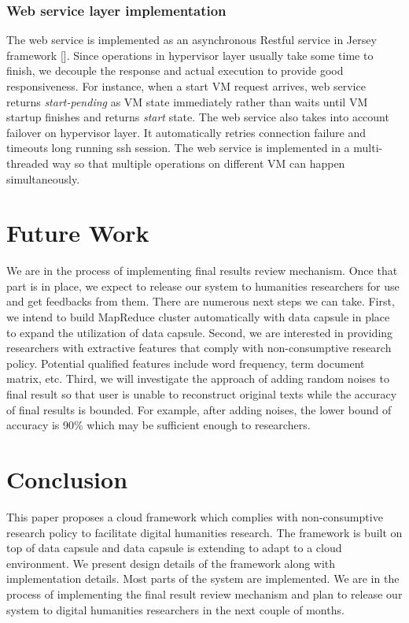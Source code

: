 \documentclass{acm_proc_article-sp}
\begin{document}
\subsubsection{Web service layer implementation}
The web service is implemented as an asynchronous Restful service in Jersey framework []. Since operations in hypervisor layer usually take some time to finish, we decouple the response and actual execution to provide good responsiveness. For instance, when a start VM request arrives, web service returns \emph{start-pending} as VM state immediately rather than waits until VM startup finishes and returns \emph{start} state. The web service also takes into account failover on hypervisor layer. It automatically retries connection failure and timeouts long running ssh session. The web service is implemented in a multi-threaded way so that multiple operations on different VM can happen simultaneously.


\section{Future Work} \label{title:future}
We are in the process of implementing final results review mechanism. Once that part is in place, we expect to release our system to humanities researchers for use and get feedbacks from them. There are numerous next steps we can take. First, we intend to build MapReduce cluster automatically with data capsule in place to expand the utilization of data capsule. Second, we are interested in providing researchers with extractive features that comply with non-consumptive research policy. Potential qualified features include word frequency, term document matrix, etc. Third, we will investigate the approach of adding random noises to final result so that user is unable to reconstruct original texts while the accuracy of final results is bounded. For example, after adding noises, the lower bound of accuracy is 90\% which may be sufficient enough to researchers.

\section{Conclusion} \label{title:conclusion}

This paper proposes a cloud framework which complies with non-consumptive research policy to facilitate digital humanities research. The framework is built on top of data capsule and data capsule is extending to adapt to a cloud environment.  We present design details of the framework along with implementation details. Most parts of the system are implemented. We are in the process of implementing the final result review mechanism and plan to release our system to digital humanities researchers in the next couple of months.
\end{document}
